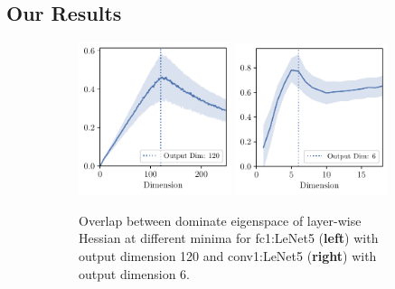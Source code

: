 \subsection{Our Results}
\begin{figure}[th]
    \centering
    \begin{subfigure}[b]{0.6\textwidth}
        \centering
        \captionsetup{justification=centering}
        \includegraphics[width=0.49\textwidth]{Figures/SubspaceOverlap/NLeNet5_multi_hyperparam/DimOverlap_CIFAR10_LeNet5_normnew_fixlr0.001_X_LeNet5_normnew_fixlr0.01_X_LeNet5_normnew_fixlr0.01_momentum_fc1.pdf}
        \includegraphics[width=0.49\textwidth]{Figures/SubspaceOverlap/NLeNet5_multi_hyperparam/DimOverlap_CIFAR10_LeNet5_normnew_fixlr0.001_X_LeNet5_normnew_fixlr0.01_X_LeNet5_normnew_fixlr0.01_momentum_conv1.pdf}
        \caption{Overlap between dominate eigenspace of layer-wise Hessian at different minima for fc1:LeNet5 (\textbf{left}) with output dimension 120 and conv1:LeNet5 (\textbf{right}) with output dimension 6.}
        \label{fig:intro_overlap}
    \end{subfigure}%
    \begin{subfigure}[b]{0.39\textwidth}
        \centering
        \captionsetup{justification=centering}

\end{subfigure}
\end{figure}

